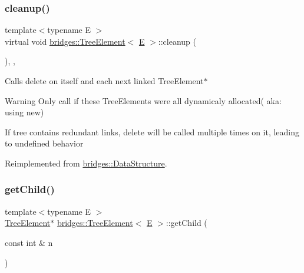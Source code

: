 \subsubsection{\texorpdfstring{cleanup()}{cleanup()}}
{\footnotesize\ttfamily template$<$typename E $>$ \\
virtual void \mbox{\hyperlink{classbridges_1_1_tree_element}{bridges\+::\+Tree\+Element}}$<$ \mbox{\hyperlink{namespacebridges_acfb0a4f7877d8f63de3e6862004c50eda3a3ea00cfc35332cedf6e5e9a32e94da}{E}} $>$\+::cleanup (\begin{DoxyParamCaption}{ }\end{DoxyParamCaption})\hspace{0.3cm}{\ttfamily [inline]}, {\ttfamily [override]}, {\ttfamily [virtual]}}

Calls delete on itself and each next linked Tree\+Element$\ast$

\begin{DoxyWarning}{Warning}
Only call if these Tree\+Elements were all dynamicaly allocated( aka\+: using new) 

If tree contains redundant links, delete will be called multiple times on it, leading to undefined behavior 
\end{DoxyWarning}


Reimplemented from \mbox{\hyperlink{classbridges_1_1_data_structure_ac3ad75810fd77f0ad35b9b5123d2c8f8}{bridges\+::\+Data\+Structure}}.

\mbox{\label{classbridges_1_1_tree_element_a14ce2d5b3a4df29c93a0c37dbe73f7a5}} 
\subsubsection{\texorpdfstring{getChild()}{getChild()}\hspace{0.1cm}{\footnotesize\ttfamily [1/2]}}
{\footnotesize\ttfamily template$<$typename E $>$ \\
\mbox{\hyperlink{classbridges_1_1_tree_element}{Tree\+Element}}$\ast$ \mbox{\hyperlink{classbridges_1_1_tree_element}{bridges\+::\+Tree\+Element}}$<$ \mbox{\hyperlink{namespacebridges_acfb0a4f7877d8f63de3e6862004c50eda3a3ea00cfc35332cedf6e5e9a32e94da}{E}} $>$\+::get\+Child (\begin{DoxyParamCaption}\item[{const int \&}]{n }\end{DoxyParamCaption})\hspace{0.3cm}{\ttfamily [inline]}}

